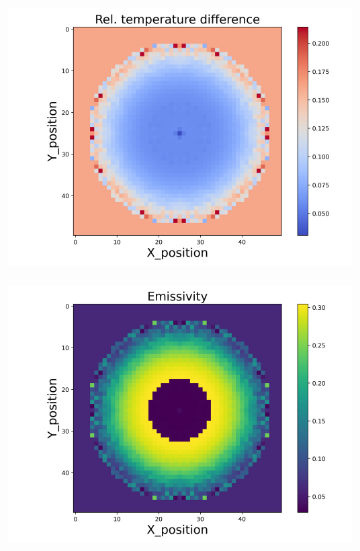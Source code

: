 \begin{figure}[htbp]
    \centering
    \begin{minipage}{\textwidth}
        \centering
        \begin{subfigure}{0.49\textwidth}
            \centering
            \includegraphics[width=\textwidth]{figures/raw_data/21/exp/T_bias.jpg}
        \end{subfigure}
        \begin{subfigure}{0.49\textwidth}
            \centering
            \includegraphics[width=\textwidth]{figures/raw_data/21/exp/emi_cal.jpg}
        \end{subfigure}
    \end{minipage}\\

\end{figure}
